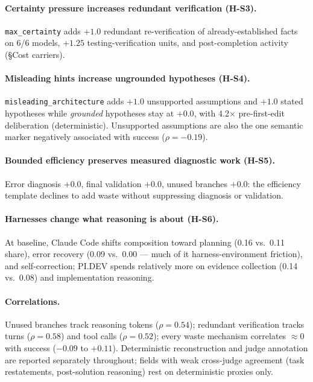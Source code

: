 \documentclass[11pt]{article}
\newcommand{\pidev}{PI.DEV}
\newcommand{\cc}{Claude Code}
\newcommand{\xd}{$\times$}
\begin{document}
\paragraph{Certainty pressure increases redundant verification (H-S3).} \texttt{max\_certainty}
adds $+1.0$ redundant re-verification of already-established facts on 6/6
models, $+1.25$ testing-verification units, and post-completion activity
(\S Cost carriers).

\paragraph{Misleading hints increase ungrounded hypotheses (H-S4).}
\texttt{misleading\_architecture} adds $+1.0$ unsupported assumptions and
$+1.0$ stated hypotheses while \emph{grounded} hypotheses stay at $+0.0$,
with 4.2\xd{} pre-first-edit deliberation (deterministic). Unsupported
assumptions are also the one semantic marker negatively associated with
success ($\rho=-0.19$).

\paragraph{Bounded efficiency preserves measured diagnostic work (H-S5).} Error
diagnosis $+0.0$, final validation $+0.0$, unused branches $+0.0$: the
efficiency template declines to add waste without suppressing diagnosis
or validation.

\paragraph{Harnesses change what reasoning is about (H-S6).} At baseline,
\cc{} shifts composition toward planning (0.16 vs.\ 0.11 share),
error recovery (0.09 vs.\ 0.00 --- much of it harness-environment
friction), and self-correction; \pidev{} spends relatively more on
evidence collection (0.14 vs.\ 0.08) and implementation reasoning.

\paragraph{Correlations.} Unused branches track reasoning tokens
($\rho=0.54$); redundant verification tracks turns ($\rho=0.58$) and tool
calls ($\rho=0.52$); every waste mechanism correlates $\approx0$ with
success ($-0.09$ to $+0.11$). Deterministic reconstruction and judge
annotation are reported separately throughout; fields with weak
cross-judge agreement (task restatements, post-solution reasoning) rest
on deterministic proxies only.
\end{document}
